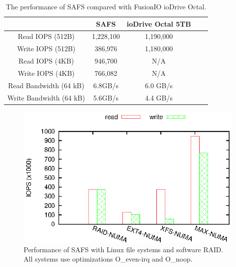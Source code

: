 \begin{table}
\begin{center}
\small
\begin{tabular}{|c|c|c|c|c|}
\hline
& SAFS & ioDrive Octal 5TB \\
\hline
Read IOPS (512B) & 1,228,100 & 1,190,000 \\
\hline
Write IOPS (512B) & 386,976 & 1,180,000 \\
\hline
Read IOPS (4KB) & 946,700 & N/A \\
\hline
Write IOPS (4KB) & 766,082 & N/A \\
\hline
Read Bandwidth (64 kB) & 6.8GB/s & 6.0 GB/s \\
\hline
Write Bandwidth (64 kB) & 5.6GB/s & 4.4 GB/s \\
\hline
\end{tabular}
\normalsize
\end{center}
\caption{The performance of SAFS compared with FusionIO ioDrive Octal.}
\label{beat_fusion}
\end{table}

\begin{figure}[tb]
\begin{center}
\includegraphics[scale=1]{figs/SAFS/vs-soft-raid.eps}
\caption{Performance of SAFS with Linux file systems and software RAID.
All systems use optimizations O\_even-irq and O\_noop.}
\label{vs_soft_raid}
\end{center}
\end{figure}


